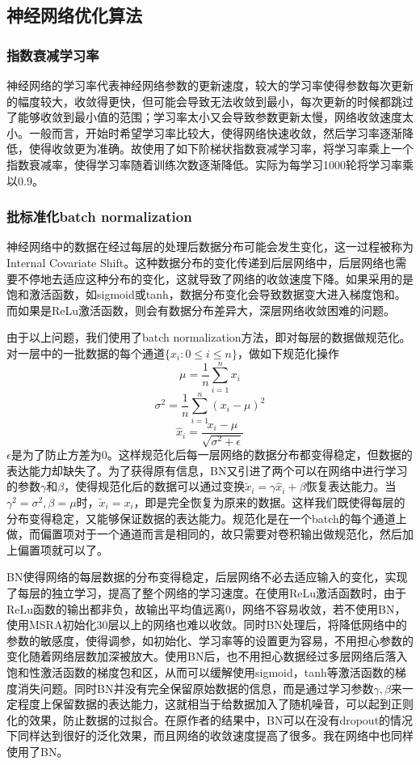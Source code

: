 \subsection{神经网络优化算法}

\subsubsection{指数衰减学习率}
\noindent

神经网络的学习率代表神经网络参数的更新速度，较大的学习率使得参数每次更新的幅度较大，收敛得更快，但可能会导致无法收敛到最小，每次更新的时候都跳过了能够收敛到最小值的范围；学习率太小又会导致参数更新太慢，网络收敛速度太小。一般而言，开始时希望学习率比较大，使得网络快速收敛，然后学习率逐渐降低，使得收敛更为准确。故使用了如下阶梯状指数衰减学习率，将学习率乘上一个指数衰减率，使得学习率随着训练次数逐渐降低。实际为每学习1000轮将学习率乘以0.9。

\subsubsection{批标准化batch normalization}
\noindent

神经网络中的数据在经过每层的处理后数据分布可能会发生变化，这一过程被称为Internal Covariate Shift\cite{bn}。这种数据分布的变化传递到后层网络中，后层网络也需要不停地去适应这种分布的变化，这就导致了网络的收敛速度下降。如果采用的是饱和激活函数，如sigmoid或tanh，数据分布变化会导致数据变大进入梯度饱和。而如果是ReLu激活函数，则会有数据分布差异大，深层网络收敛困难的问题\cite{bn-relu}。

由于以上问题，我们使用了batch normalization方法，即对每层的数据做规范化。对一层中的一批数据的每个通道$\{x_i : 0 \le i \le n\}$，做如下规范化操作
$$\mu = \frac 1 n \sum^n_{i = 1} x_i$$
$$\sigma^2 = \frac 1 n \sum^n_{i=1}(x_i - \mu)^2$$
$$\hat{x}_i = \frac{x_i - \mu}{\sqrt{\sigma^2 + \epsilon}}$$
$\epsilon$是为了防止方差为0。这样规范化后每一层网络的数据分布都变得稳定，但数据的表达能力却缺失了。为了获得原有信息，BN又引进了两个可以在网络中进行学习的参数$\gamma$和$\beta$，使得规范化后的数据可以通过变换$\tilde{x}_i = \gamma \hat{x}_i + \beta$恢复表达能力。当$\gamma^2 = \sigma^2, \beta = \mu$时，$\tilde{x}_i = x_i$，即是完全恢复为原来的数据。这样我们既使得每层的分布变得稳定，又能够保证数据的表达能力。规范化是在一个batch的每个通道上做，而偏置项对于一个通道而言是相同的，故只需要对卷积输出做规范化，然后加上偏置项就可以了。

BN使得网络的每层数据的分布变得稳定，后层网络不必去适应输入的变化，实现了每层的独立学习，提高了整个网络的学习速度。在使用ReLu激活函数时，由于ReLu函数的输出都非负，故输出平均值远离0，网络不容易收敛，若不使用BN，使用MSRA初始化30层以上的网络也难以收敛\cite{bn-relu}。同时BN处理后，将降低网络中的参数的敏感度，使得调参，如初始化、学习率等的设置更为容易，不用担心参数的变化随着网络层数加深被放大。使用BN后，也不用担心数据经过多层网络后落入饱和性激活函数的梯度包和区，从而可以缓解使用sigmoid，tanh等激活函数的梯度消失问题。同时BN并没有完全保留原始数据的信息，而是通过学习参数$\gamma, \beta$来一定程度上保留数据的表达能力，这就相当于给数据加入了随机噪音，可以起到正则化的效果，防止数据的过拟合。在原作者的结果中，BN可以在没有dropout的情况下同样达到很好的泛化效果，而且网络的收敛速度提高了很多。\cite{bn}我在网络中也同样使用了BN。

